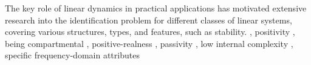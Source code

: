 The key role of linear dynamics in practical applications has motivated extensive research into the identification problem for different classes of linear systems, covering various structures, types, and features, such as 
stability.
\cite{lacy2003subspace,pillonetto2014kernel}, 
positivity 
\cite{khosravi2021POS,zheng2021bayesian,khosravi2020regularized},
being compartmental 
\cite{benvenuti2002model}, 
positive-realness 
\cite{goethals2003identification}, 
passivity 
\cite{rodrigues2021novel},
low internal complexity 
\cite{smith2014frequency,khosravi2020low,pillonetto2016AtomicNuclearKernel}, 
specific frequency-domain attributes 

